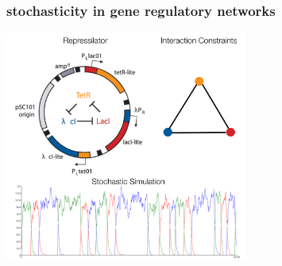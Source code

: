 \begin{frame}
\vspace{1em}
\frametitle{stochasticity in gene regulatory networks}
\begin{center}
\includegraphics[width=0.6\textwidth]{fig/repressilator_constraints.pdf}\\
\hfill \cite{Elowitz2000b}
\end{center}
\end{frame}
